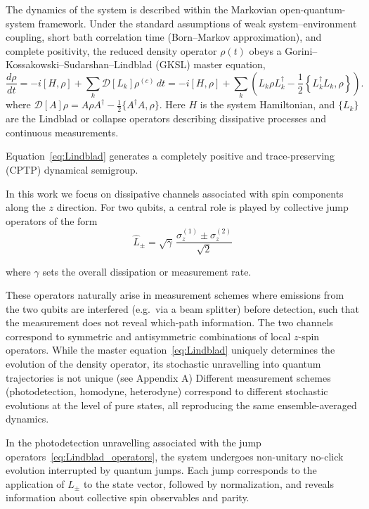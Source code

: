 The dynamics of the system is described within the Markovian open-quantum-system framework.
Under the standard assumptions of weak system--environment coupling, short bath correlation time
(Born--Markov approximation), and complete positivity, the reduced density operator $\rho(t)$
obeys a Gorini--Kossakowski--Sudarshan--Lindblad (GKSL) master equation,
\begin{equation}
	\frac{d\rho}{dt}
	= - i \left[ H, \rho \right] + \sum_k \mathcal{D}[L_k]\rho^{(c)}\,dt = 
	- i \left[ H, \rho \right]
	+
	\sum_k
	\left(
	L_k \rho L_k^\dagger
	-
	\frac{1}{2}
	\left\{
	L_k^\dagger L_k,\rho
	\right\}
	\right).
	\label{eq:Lindblad}
\end{equation}
where $\mathcal{D}[A]\rho = A\rho A^\dagger - \tfrac{1}{2}\{A^\dagger A,\rho\}$. Here $H$ is the system Hamiltonian,
and $\{L_k\}$ are the Lindblad or collapse operators describing dissipative processes and continuous measurements.

Equation~\eqref{eq:Lindblad} generates a completely positive and trace-preserving (CPTP) dynamical semigroup.

In this work we focus on dissipative channels associated with spin components along the $z$ direction.
For two qubits, a central role is played by collective jump operators of the form
\begin{equation}
	\hat{L}_\pm
	=
	\sqrt{\gamma}\,
	\frac{\sigma_z^{(1)} \pm \sigma_z^{(2)}}{\sqrt{2}}
	\label{eq:Lindblad_operators}
\end{equation}

where $\gamma$ sets the overall dissipation or measurement rate.

These operators naturally arise in measurement schemes where emissions from the two qubits are interfered
(e.g.\ via a beam splitter) before detection, such that the measurement does not reveal which-path information.
The two channels correspond to symmetric and antisymmetric combinations of local $z$-spin operators.
While the master equation~\eqref{eq:Lindblad} uniquely determines the evolution of the density operator,
its stochastic unravelling into quantum trajectories is not unique (see Appendix A)
Different measurement schemes (photodetection, homodyne, heterodyne) correspond to different
stochastic evolutions at the level of pure states, all reproducing the same ensemble-averaged dynamics.

In the photodetection unravelling associated with the jump operators~\eqref{eq:Lindblad_operators},
the system undergoes non-unitary no-click evolution interrupted by quantum jumps.
Each jump corresponds to the application of $L_\pm$ to the state vector,
followed by normalization, and reveals information about collective spin observables and parity.

